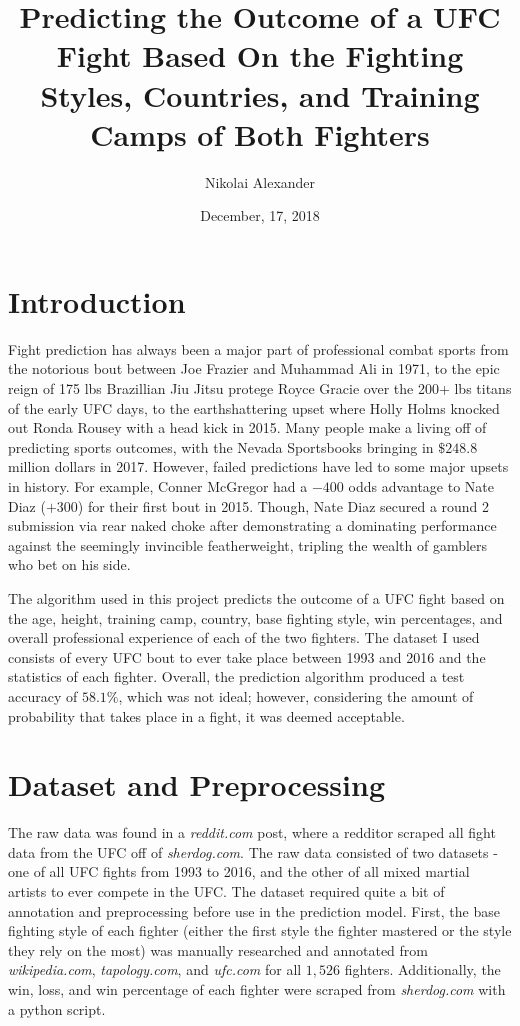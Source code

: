 \documentclass[12pt]{article}
\begin{document}
\title{Predicting the Outcome of a UFC Fight Based On the Fighting Styles, Countries, and Training Camps of Both Fighters}
\date{December, 17,  2018}
\author{Nikolai Alexander}
\maketitle

\section{Introduction}

Fight prediction has always been a major part of professional combat sports from the notorious bout between Joe Frazier and Muhammad Ali in 1971, to the epic reign of 175 lbs Brazillian Jiu Jitsu  protege Royce Gracie over the 200+ lbs titans of the early UFC days, to the earthshattering upset where Holly Holms knocked out Ronda Rousey with a head kick in 2015. Many people make a living off of predicting sports outcomes, with the Nevada Sportsbooks bringing in $\$248.8$ million dollars in 2017. However, failed predictions have led to some major upsets in history. For example, Conner McGregor had a $-400$ odds advantage to Nate Diaz ($+300$) for their first bout in 2015. Though, Nate Diaz secured a round 2 submission via rear naked choke after demonstrating a dominating performance against the seemingly invincible featherweight, tripling the wealth of gamblers who bet on his side.

The algorithm used in this project predicts the outcome of a UFC fight based on the age, height, training camp, country, base fighting style, win percentages, and overall professional experience of each of the two fighters. The dataset I used consists of every UFC bout to ever take place between 1993 and 2016 and the statistics of each fighter. Overall, the prediction algorithm produced a test accuracy of $58.1\%$, which was not ideal; however, considering the amount of probability that takes place in a fight, it was deemed acceptable.


\section{Dataset and Preprocessing}

The raw data was found in a \emph{reddit.com} post, where a redditor scraped all fight data from the UFC off of \emph{sherdog.com}. The raw data consisted of two datasets - one of all UFC fights from 1993 to 2016, and the other of all mixed martial artists to ever compete in the UFC. The dataset required quite a bit of annotation and preprocessing before use in the prediction model. First, the base fighting style of each fighter (either the first style the fighter mastered or the style they rely on the most) was manually researched and annotated from \emph{wikipedia.com}, \emph{tapology.com}, and \emph{ufc.com} for all $1,526$ fighters. Additionally, the win, loss, and win percentage of each fighter were scraped from \emph{sherdog.com} with a python script.
\end{document}
